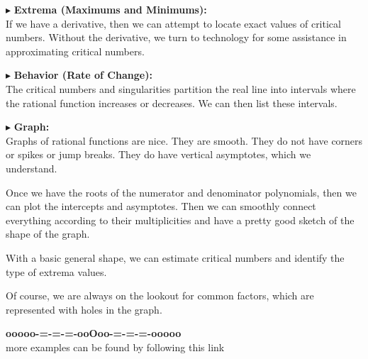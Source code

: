\documentclass{ximera}
\begin{document}
$\blacktriangleright$ \textbf{\textcolor{red!10!blue!90!}{Extrema (Maximums and Minimums):}} \\
If we have a derivative, then we can attempt to locate exact values of critical numbers.  Without the derivative, we turn to technology for some assistance in approximating critical numbers.




$\blacktriangleright$ \textbf{\textcolor{red!10!blue!90!}{Behavior (Rate of Change):}} \\
The critical numbers and singularities partition the real line into intervals where the rational function increases or decreases.  We can then list these intervals.

















$\blacktriangleright$ \textbf{\textcolor{red!10!blue!90!}{Graph:}} \\
Graphs of rational functions are nice.  They are smooth.  They do not have corners or spikes or jump breaks. They do have vertical asymptotes, which we understand.


Once we have the roots of the numerator and denominator polynomials, then we can plot the intercepts and asymptotes.  Then we can smoothly connect everything according to their multiplicities and have a pretty good sketch of the shape of the graph.

With a basic general shape, we can estimate critical numbers and identify the type of extrema values. 

Of course, we are always on the lookout for common factors, which are represented with holes in the graph. \\





















\begin{center}
\textbf{\textcolor{green!50!black}{ooooo-=-=-=-ooOoo-=-=-=-ooooo}} \\

more examples can be found by following this link\\ 

\end{center}
\end{document}
